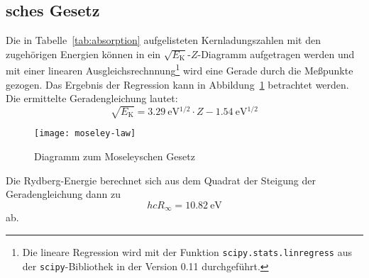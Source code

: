 \subsection{sches Gesetz}

Die in Tabelle~\ref{tab:absorption} aufgelisteten Kernladungszahlen mit
den zugehörigen Energien können in ein
$\sqrt{E_\mathrm{K}}$-$Z$-Diagramm aufgetragen werden und mit einer
linearen Ausgleichsrechnnung\footnote{Die lineare Regression wird mit
  der Funktion \texttt{scipy.stats.linregress} aus der
  \texttt{scipy}-Bibliothek in der Version 0.11 durchgeführt.} wird eine
Gerade durch die Meßpunkte gezogen. Das Ergebnis der Regression kann in
Abbildung~\ref{fig:moseley} betrachtet werden. Die ermittelte
Geradengleichung lautet:
%
\begin{equation}
  \label{eq:moseley-gerade}
  \sqrt{E_\mathrm{K}} = \SI{3.29}{\electronvolt^{1/2}} \cdot Z
  - \SI{1.54}{\electronvolt^{1/2}}
\end{equation}

\begin{figure}
  \centering
  \texttt{[image: moseley-law]}
  \caption{Diagramm zum Moseleyschen Gesetz}
  \label{fig:moseley}
\end{figure}

Die Rydberg-Energie berechnet sich aus dem Quadrat der Steigung der
Geradengleichung dann zu
%
\begin{equation}
  h c R_\infty = \SI{10.82}{\electronvolt}
\end{equation}
%
ab.
